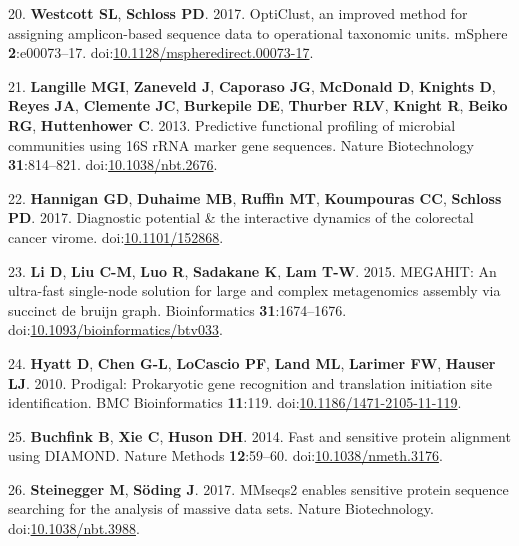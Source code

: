\documentclass[11pt,]{article}
\begin{document}
\hypertarget{ref-opticlust_westcott2017}{}
20. \textbf{Westcott SL}, \textbf{Schloss PD}. 2017. OptiClust, an
improved method for assigning amplicon-based sequence data to
operational taxonomic units. mSphere \textbf{2}:e00073--17.
doi:\href{https://doi.org/10.1128/mspheredirect.00073-17}{10.1128/mspheredirect.00073-17}.

\hypertarget{ref-Langille2013}{}
21. \textbf{Langille MGI}, \textbf{Zaneveld J}, \textbf{Caporaso JG},
\textbf{McDonald D}, \textbf{Knights D}, \textbf{Reyes JA},
\textbf{Clemente JC}, \textbf{Burkepile DE}, \textbf{Thurber RLV},
\textbf{Knight R}, \textbf{Beiko RG}, \textbf{Huttenhower C}. 2013.
Predictive functional profiling of microbial communities using 16S rRNA
marker gene sequences. Nature Biotechnology \textbf{31}:814--821.
doi:\href{https://doi.org/10.1038/nbt.2676}{10.1038/nbt.2676}.

\hypertarget{ref-Hannigan2017}{}
22. \textbf{Hannigan GD}, \textbf{Duhaime MB}, \textbf{Ruffin MT},
\textbf{Koumpouras CC}, \textbf{Schloss PD}. 2017. Diagnostic potential
\& the interactive dynamics of the colorectal cancer virome.
doi:\href{https://doi.org/10.1101/152868}{10.1101/152868}.

\hypertarget{ref-Li2015}{}
23. \textbf{Li D}, \textbf{Liu C-M}, \textbf{Luo R}, \textbf{Sadakane
K}, \textbf{Lam T-W}. 2015. MEGAHIT: An ultra-fast single-node solution
for large and complex metagenomics assembly via succinct de bruijn
graph. Bioinformatics \textbf{31}:1674--1676.
doi:\href{https://doi.org/10.1093/bioinformatics/btv033}{10.1093/bioinformatics/btv033}.

\hypertarget{ref-Hyatt2010}{}
24. \textbf{Hyatt D}, \textbf{Chen G-L}, \textbf{LoCascio PF},
\textbf{Land ML}, \textbf{Larimer FW}, \textbf{Hauser LJ}. 2010.
Prodigal: Prokaryotic gene recognition and translation initiation site
identification. BMC Bioinformatics \textbf{11}:119.
doi:\href{https://doi.org/10.1186/1471-2105-11-119}{10.1186/1471-2105-11-119}.

\hypertarget{ref-Buchfink2014}{}
25. \textbf{Buchfink B}, \textbf{Xie C}, \textbf{Huson DH}. 2014. Fast
and sensitive protein alignment using DIAMOND. Nature Methods
\textbf{12}:59--60.
doi:\href{https://doi.org/10.1038/nmeth.3176}{10.1038/nmeth.3176}.

\hypertarget{ref-Steinegger2017}{}
26. \textbf{Steinegger M}, \textbf{Söding J}. 2017. MMseqs2 enables
sensitive protein sequence searching for the analysis of massive data
sets. Nature Biotechnology.
doi:\href{https://doi.org/10.1038/nbt.3988}{10.1038/nbt.3988}.
\end{document}
